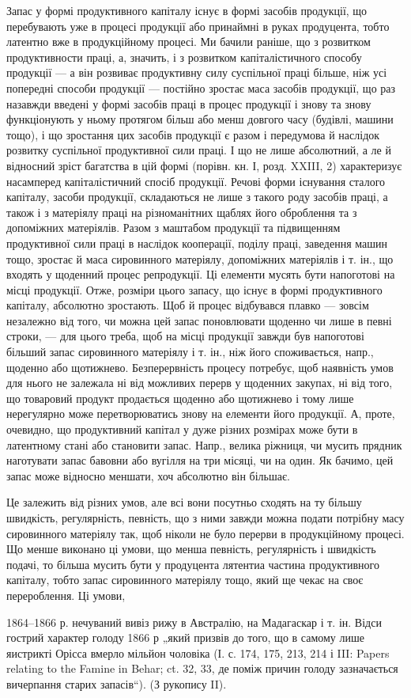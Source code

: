 Запас у формі продуктивного капіталу існує в формі засобів продукції,
що перебувають уже в процесі продукції або принаймні в руках
продуцента, тобто латентно вже в продукційному процесі. Ми бачили
раніше, що з розвитком продуктивности праці, а, значить, і з розвитком
капіталістичного способу продукції — а він розвиває продуктивну
силу суспільної праці більше, ніж усі попередні способи продукції —
постійно зростає маса засобів продукції, що раз назавжди введені
у формі засобів праці в процес продукції і знову та знову
функціонують у ньому протягом більш або менш довгого часу (будівлі,
машини тощо), і що зростання цих засобів продукції є разом і передумова
й наслідок розвитку суспільної продуктивної сили праці. І що не
лише абсолютний, а ле й відносний зріст багатства в цій формі (порівн.
кн. І, розд. XXIII, 2) характеризує насамперед капіталістичний спосіб
продукції. Речові форми існування сталого капіталу, засоби продукції,
складаються не лише з такого роду засобів праці, а також і з матеріялу
праці на різноманітних щаблях його оброблення та з допоміжних матеріялів.
Разом з маштабом продукції та підвищенням продуктивної сили
праці в наслідок кооперації, поділу праці, заведення машин тощо, зростає
й маса сировинного матеріялу, допоміжних матеріялів і т. ін., що
входять у щоденний процес репродукції. Ці елементи мусять бути напоготові
на місці продукції. Отже, розміри цього запасу, що існує в формі продуктивного
капіталу, абсолютно зростають. Щоб й процес відбувався плавко —
зовсім незалежно від того, чи можна цей запас поновлювати щоденно чи
лише в певні строки, — для цього треба, щоб на місці продукції завжди
був напоготові більший запас сировинного матеріялу і т. ін., ніж його
споживається, напр., щоденно або щотижнево. Безперервність процесу
потребує, щоб наявність умов для нього не залежала ні від можливих
перерв у щоденних закупах, ні від того, що товаровий продукт продається
щоденно або щотижнево і тому лише нерегулярно може перетворюватись
знову на елементи його продукції. А, проте, очевидно, що
продуктивний капітал у дуже різних розмірах може бути в латентному
стані або становити запас. Напр., велика ріжниця, чи мусить прядник
наготувати запас бавовни або вугілля на три місяці, чи на один. Як
бачимо, цей запас може відносно меншати, хоч абсолютно він більшає.

Це залежить від різних умов, але всі вони посутньо сходять на ту
більшу швидкість, регулярність, певність, що з ними завжди можна подати
потрібну масу сировинного матеріялу так, щоб ніколи не було перерви
в продукційному процесі. Що менше виконано ці умови, що менша
певність, регулярність і швидкість подачі, то більша мусить бути у продуцента
лятентиа частина продуктивного капіталу, тобто запас сировинного
матеріялу тощо, який ще чекає на своє перероблення. Ці умови,

1864--1866 р. нечуваний вивіз рижу в Австралію, на Мадагаскар і т. ін. Відси
гострий характер голоду 1866 р „який призвів до того, що в самому лише
яистрикті Орісса вмерло мільйон чоловіка (І. с. 174, 175, 213, 214 і III: Papers relating
to the Famine in Behar; ct. 32, 33, де поміж причин голоду зазначається вичерпання старих запасів“).
(З рукопису II).
\parbreak{}  %
